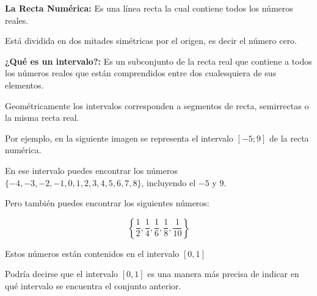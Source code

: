 \documentclass[12pt,a4paper]{article}
\begin{document}
\begin{tcolorbox}[colback=fondoazul,colframe=azuloscuro,title=RECUERDA QUE...,breakable]

\textbf{La Recta Numérica:} Es una línea recta la cual contiene todos los números reales.

Está dividida en dos mitades simétricas por el origen, es decir el número cero.

\textbf{¿Qué es un intervalo?:} Es un subconjunto de la recta real que contiene a todos los números reales que están comprendidos entre dos cualesquiera de sus elementos.

Geométricamente los intervalos corresponden a segmentos de recta, semirrectas o la misma recta real.

Por ejemplo, en la siguiente imagen se representa el intervalo $[-5; 9]$ de la recta numérica.

\begin{center}
\end{center}

En ese intervalo puedes encontrar los números $\{-4, -3, -2, -1, 0, 1, 2, 3, 4, 5, 6, 7, 8\}$, incluyendo el $-5$ y $9$.

Pero también puedes encontrar los siguientes números:

\[ \left\{\frac{1}{2}, \frac{1}{4}, \frac{1}{6}, \frac{1}{8}, \frac{1}{10}\right\} \]

Estos números están contenidos en el intervalo $[0, 1]$

Podría decirse que el intervalo $[0, 1]$ es una manera más precisa de indicar en qué intervalo se encuentra el conjunto anterior.

\end{tcolorbox}
\end{document}

